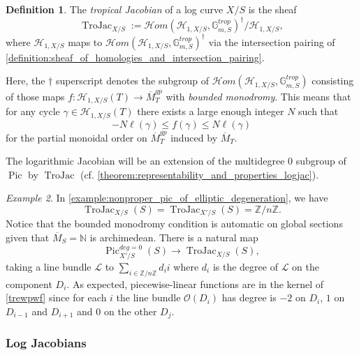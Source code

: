 \documentclass[a4paper,11pt]{amsart} %
\numberwithin{equation}{subsection}
\newcommand{\on}[1]{\operatorname{#1}}
\newcommand{\bb}[1]{{\mathbb{#1}}}
\newcommand{\ca}[1]{{\mathcal{#1}}}
\def\sheafhom{\mathcal{H}om}
\def\o#1{\overline{#1}}
\theoremstyle{definition}
\newtheorem{definition}{Definition}[section]
\theoremstyle{plain}%
\theoremstyle{remark}
\newtheorem{example}[definition]{Example}
\begin{document}
\begin{definition}\label{definition:tropical_jacobian_bounded_monodromy}
    The \emph{tropical Jacobian} of a log curve $X/S$ is the sheaf
    \[
    \on{TroJac}_{X/S}:=\sheafhom(\ca H_{1,X/S},\bb G_{m,S}^{trop})^\dagger/\ca H_{1,X/S},
    \]
    where $\ca H_{1,X/S}$ maps to $\sheafhom(\ca H_{1,X/S},\bb G_{m,S}^{trop})^\dagger$ via the intersection pairing of \ref{definition:sheaf_of_homologies_and_intersection_pairing}.
    
    Here, the $\dagger$ superscript denotes the subgroup of $\sheafhom(\ca H_{1,X/S},\bb G_{m,S}^{trop})$ consisting of those maps $f \colon \ca H_{1,X/S}(T) \to \o M_T^{gp}$ with \emph{bounded monodromy}. This means that for any cycle $\gamma\in \ca H_{1,X/S}(T)$ there exists a large enough integer $N$ such that
    \[
    -N\ell(\gamma)\leq f(\gamma) \leq N\ell(\gamma)
    \]
    for the partial monoidal order on $\o M_T^{gp}$ induced by $\o M_T$.
\end{definition}

The logarithmic Jacobian will be an extension of the multidegree $0$ subgroup of $\on{Pic}$ by $\on{TroJac}$ (cf. \ref{theorem:representability_and_properties_logjac}).

\begin{example}\label{example:global_sections_trojac_of_elliptic_degen_curve_over_dvr}
    In \ref{example:nonproper_pic_of_elliptic_degeneration}, we have
    \[
    \on{TroJac}_{X/S}(S) = \on{TroJac}_{X'/S}(S) = \bb Z/n\bb Z.
    \]
    Notice that the bounded monodromy condition is automatic on global sections given that $\o M_S=\bb N$ is archimedean. There is a natural map 
    \begin{equation}\label{trewpwf}
        \on{Pic}^{deg=0}_{X'/S}(S) \to \on{TroJac}_{X/S}(S),
    \end{equation}
    taking a line bundle $\ca L$ to $\sum_{i\in \bb Z/n\bb Z} d_i i$ where $d_i$ is the degree of $\ca L$ on the component $D_i$. As expected, piecewise-linear functions are in the kernel of \ref{trewpwf} since for each $i$ the line bundle $\ca O(D_i)$ has degree is $-2$ on $D_i$, $1$ on $D_{i-1}$ and $D_{i+1}$ and $0$ on the other $D_j$.
\end{example}



\subsubsection{Log Jacobians}\label{section:log_lbs}
\end{document}
